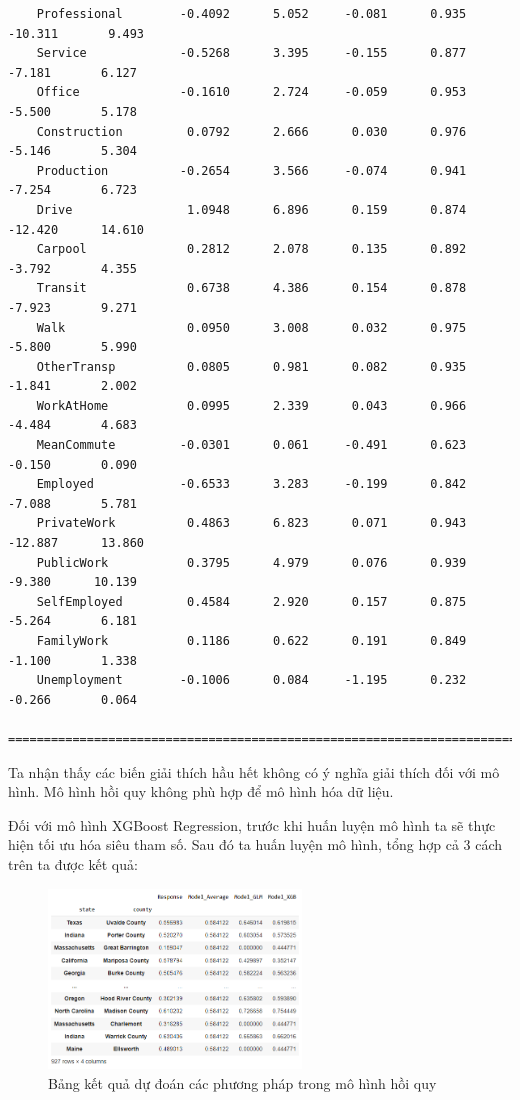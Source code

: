 \documentclass[14pt, a4paper]{article}
\numberwithin{equation}{section}
\numberwithin{figure}{section}
\numberwithin{dl}{section}
\numberwithin{md}{section}
\numberwithin{bd}{section}
\numberwithin{dn}{section}
\numberwithin{hq}{section}
\begin{document}
\begin{verbatim}
    Professional        -0.4092      5.052     -0.081      0.935     -10.311       9.493
    Service             -0.5268      3.395     -0.155      0.877      -7.181       6.127
    Office              -0.1610      2.724     -0.059      0.953      -5.500       5.178
    Construction         0.0792      2.666      0.030      0.976      -5.146       5.304
    Production          -0.2654      3.566     -0.074      0.941      -7.254       6.723
    Drive                1.0948      6.896      0.159      0.874     -12.420      14.610
    Carpool              0.2812      2.078      0.135      0.892      -3.792       4.355
    Transit              0.6738      4.386      0.154      0.878      -7.923       9.271
    Walk                 0.0950      3.008      0.032      0.975      -5.800       5.990
    OtherTransp          0.0805      0.981      0.082      0.935      -1.841       2.002
    WorkAtHome           0.0995      2.339      0.043      0.966      -4.484       4.683
    MeanCommute         -0.0301      0.061     -0.491      0.623      -0.150       0.090
    Employed            -0.6533      3.283     -0.199      0.842      -7.088       5.781
    PrivateWork          0.4863      6.823      0.071      0.943     -12.887      13.860
    PublicWork           0.3795      4.979      0.076      0.939      -9.380      10.139
    SelfEmployed         0.4584      2.920      0.157      0.875      -5.264       6.181
    FamilyWork           0.1186      0.622      0.191      0.849      -1.100       1.338
    Unemployment        -0.1006      0.084     -1.195      0.232      -0.266       0.064
    ====================================================================================
    \end{verbatim}

    Ta nhận thấy các biến giải thích hầu hết không có ý nghĩa giải thích đối với mô hình.
    Mô hình hồi quy không phù hợp để mô hình hóa dữ liệu.

    Đối với mô hình XGBoost Regression, trước khi huấn luyện mô hình ta sẽ thực hiện tối ưu hóa siêu tham số.
    Sau đó ta huấn luyện mô hình, tổng hợp cả 3 cách trên ta được kết quả:

    \begin{figure}[h!]
        \centering
        \includegraphics[width=0.6\textwidth]{figures/Regression_Model_Result.png}
        \caption{Bảng kết quả dự đoán các phương pháp trong mô hình hồi quy}
    \end{figure}
\end{document}
